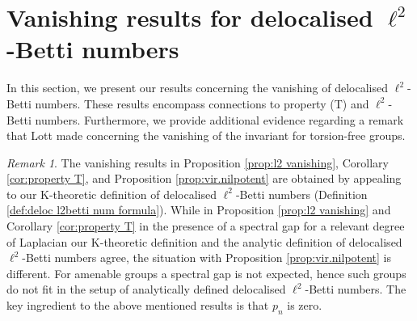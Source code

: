 \documentclass[a4paper,leqno,12pt]{article}
\numberwithin{equation}{section}
\theoremstyle{plain}
\newtheorem{question}[theoremcounter]{Question}
\theoremstyle{definition}
\theoremstyle{remark}
\newtheorem{remark}[theoremcounter]{Remark}
\begin{document}
	
	
	
	
	\section{Vanishing results for delocalised \texorpdfstring {$\ell^2$-} -Betti numbers} \label{sec: vanishing}
    In this section, we present our results concerning the vanishing of delocalised $\ell^2$-Betti numbers.  
    These results encompass connections to property (T) and $\ell^2$-Betti numbers. Furthermore, we provide additional evidence regarding a remark that Lott made concerning the vanishing of the invariant for torsion-free groups. 
    \begin{remark}
    The vanishing results in Proposition \ref{prop:l2 vanishing}, Corollary \ref{cor:property T}, and Proposition \ref{prop:vir.nilpotent} are obtained by appealing to our K-theoretic definition of  delocalised $\ell^2$-Betti numbers (Definition \ref{def:deloc l2betti num formula}). While in Proposition \ref{prop:l2 vanishing} and Corollary \ref{cor:property T} in the presence of a spectral gap for a relevant degree of Laplacian our K-theoretic definition and the analytic definition of delocalised $\ell^2$-Betti numbers agree, the situation with Proposition \ref{prop:vir.nilpotent} is different. For amenable groups a spectral gap is not expected, hence such groups do not fit in the setup of analytically defined delocalised $\ell^2$-Betti numbers. The key ingredient to the above mentioned results is that $p_n$ is zero.
    
\end{remark}
    
\end{document}
